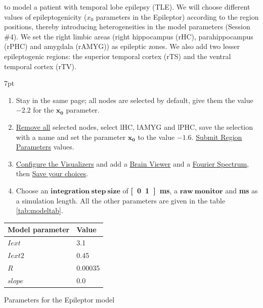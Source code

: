 \documentclass{tufte-handout}
\newenvironment{simulation}{%
  \def\FrameCommand{%
    \hspace{1pt}%
    {\color{ForestGreen}\vrule width 2pt}%
    {\color{simulationshade}\vrule width 4pt}%
    \colorbox{simulationshade}%
  }%
  \MakeFramed{\advance\hsize-\width\FrameRestore}%
  \noindent\hspace{-4.55pt}%
  \begin{adjustwidth}{}{7pt}%
  \vspace{2pt}\vspace{2pt}%
}
{%
  \vspace{2pt}\end{adjustwidth}\endMakeFramed%
}
\begin{document}
 to model a patient with temporal lobe epilepsy (TLE). We will choose different values of
epileptogenicity ($x_0$ parameters in the Epileptor) according to the region positions, thereby introducing heterogeneities in
the model parameters (Session \#4). We set the right limbic areas 
(right hippocampus (rHC), parahippocampus (rPHC) and amygdala (rAMYG)) as epileptic zones. We also add two lesser epileptogenic regions: 
the superior temporal cortex (rTS) and the ventral temporal cortex (rTV).

\begin{simulation}
  \begin{enumerate}
  \item Stay in the same page; all nodes are selected by default, give them the value $\mathbf{-2.2}$ for the $\mathbf{x_0}$ parameter.
  \item \underline{Remove all} selected nodes, select lHC, lAMYG and lPHC, save the selection with a name
	and set the parameter $\mathbf{x_0}$ to the value $\mathbf{-1.6}$. \underline{Submit Region Parameters} values.
  \item \underline{Configure the Visualizers} and add a \underline{Brain Viewer} and a \underline{Fourier Spectrum}, 
  then \underline{Save your choices}.
  \item Choose an $\mathbf{integration\:step\:size}$ of \textbf{\unit[0.1]{ms}}, a $\mathbf{raw\:monitor}$ and \textbf{\unit[6000]{ms}} as a simulation length. 
  All the other parameters are
  given in the table \ref{tab:modeltab}.
 \end{enumerate}
\end{simulation}

\begin{margintable}
  \centering
  \selectfont
  \begin{tabular}{ll}
    \toprule
    Model parameter & Value \\
    \midrule
             $Iext$          &   3.1  \\
             $Iext2$          &  0.45   \\
             $R$           &   0.00035        \\
             $slope$           &   0.0   \\
    \bottomrule
  \end{tabular}
  \caption{Parameters for the Epileptor model	 }
  \label{tab:modeltab}
\end{margintable}
\end{document}
